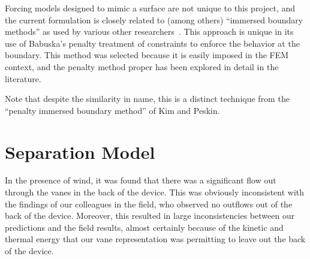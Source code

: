Forcing models designed to mimic a surface
are not unique to this project, and the current formulation is
 closely related to (among others)
``immersed boundary methods'' as used by various other
researchers~\cite{doi:10.1146/annurev.fluid.37.061903.175743,verzicco1998complex}. This
approach is unique in its use of Babuska's penalty treatment of
constraints\cite{1973fempen,ZAMM:ZAMM19880680925} to enforce the
behavior at the boundary. This method was selected because it is easily
imposed in the FEM context, and the penalty method proper has been
explored in detail in the literature.

Note that despite the similarity in name, this is a distinct technique
from the ``penalty immersed boundary method'' of Kim and
Peskin\cite{:/content/aip/journal/pof2/19/5/10.1063/1.2734674}.  




\section{Separation Model}
\label{sec:separation}

In the presence of wind, it was found that there was a significant flow
out through the vanes in the back of the device. This was obviously
inconsistent with the findings of our colleagues in the field, who
observed no outflows out of the back of the device. Moreover, this resulted
in large inconsistencies between our predictions and the field results,
almost certainly because of the kinetic and thermal energy that our vane
representation was permitting to leave out the back of the device.  

